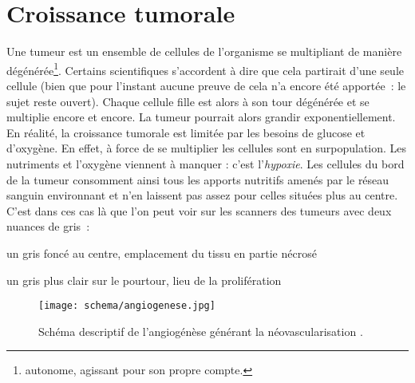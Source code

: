 \documentclass[main.tex]{subfiles}
\begin{document}
\section{Croissance tumorale}
Une tumeur est un ensemble de cellules de l'organisme se multipliant de manière dégénérée\footnote{%
autonome, agissant pour son propre compte.}. Certains scientifiques s'accordent à dire que cela partirait d'une seule cellule (bien que pour l'instant aucune preuve de cela n'a encore été apportée~: le sujet reste ouvert). 
Chaque cellule fille est alors à son tour dégénérée et se multiplie encore et encore. 
La tumeur pourrait alors grandir exponentiellement. En réalité, la croissance tumorale est limitée par les besoins de glucose et d'oxygène. En effet, à force de se multiplier les cellules sont en surpopulation. 
Les nutriments et l'oxygène viennent à manquer : c'est l'\emph{hypoxie}. 
Les cellules du bord de la tumeur consomment ainsi tous les apports nutritifs amenés par le réseau sanguin environnant et n'en laissent pas assez pour celles situées plus au centre. 
C'est dans ces cas là que l'on peut voir sur les scanners des tumeurs avec deux nuances de gris~:
\begin{myitemize}
\item un gris foncé au centre, emplacement du tissu en partie nécrosé
\item un gris plus clair sur le pourtour, lieu de la prolifération
\end{myitemize}
\begin{wrapfigure}[26]{O}{.62\textwidth}
\vspace{10mm}
\texttt{[image: schema/angiogenese.jpg]}
\caption{\label{fig:schema_angio} Schéma descriptif de l'angiogénèse générant la néovascularisation \cite{webangiogenese}.}
\end{wrapfigure}
\end{document}

